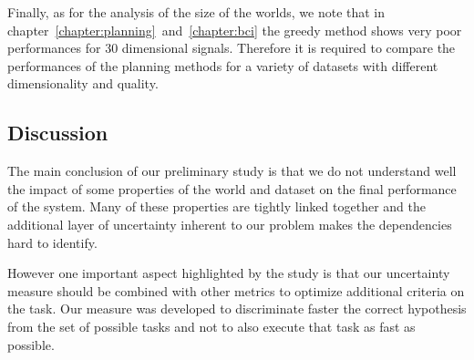 Finally, as for the analysis of the size of the worlds, we note that in chapter~\ref{chapter:planning}~and~\ref{chapter:bci} the greedy method shows very poor performances for 30 dimensional signals. Therefore it is required to compare the performances of the planning methods for a variety of datasets with different dimensionality and quality.

\subsection{Discussion}

The main conclusion of our preliminary study is that we do not understand well the impact of some properties of the world and dataset on the final performance of the system. Many of these properties are tightly linked together and the additional layer of uncertainty inherent to our problem makes the dependencies hard to identify.

However one important aspect highlighted by the study is that our uncertainty measure should be combined with other metrics to optimize additional criteria on the task. Our measure was developed to discriminate faster the correct hypothesis from the set of possible tasks and not to also execute that task as fast as possible.


